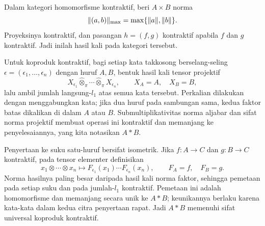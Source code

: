 \begin{o001solution}
\begin{o001proof}
Dalam kategori homomorfisme kontraktif, beri $A\times B$ norma
\[
  \lVert(a,b)\rVert_{\max}=\max\{\lVert a\rVert,\lVert b\rVert\}.
\]
Proyeksinya kontraktif, dan pasangan $h=(f,g)$ kontraktif apabila $f$ dan
$g$ kontraktif. Jadi inilah hasil kali pada kategori tersebut.

Untuk koproduk kontraktif, bagi setiap kata takkosong berselang-seling
$\epsilon=(\epsilon_1,\ldots,\epsilon_n)$ dengan huruf $A,B$, bentuk hasil
kali tensor projektif
\[
 X_{\epsilon_1}\mathbin{\widehat{\otimes}_{\pi}}\cdots
 \mathbin{\widehat{\otimes}_{\pi}}X_{\epsilon_n},
 \qquad X_A=A,\quad X_B=B,
\]
lalu ambil jumlah langsung-$l_1$ atas semua kata tersebut. Perkalian
dilakukan dengan menggabungkan kata; jika dua huruf pada sambungan sama,
kedua faktor batas dikalikan di dalam $A$ atau $B$. Submultiplikativitas
norma aljabar dan sifat norma projektif membuat operasi ini kontraktif dan
memanjang ke penyelesaiannya, yang kita notasikan $A*B$.

Penyertaan ke suku satu-huruf bersifat isometrik. Jika
$f:A\to C$ dan $g:B\to C$ kontraktif, pada tensor elementer definisikan
\[
 x_1\otimes\cdots\otimes x_n\longmapsto
 F_{\epsilon_1}(x_1)\cdots F_{\epsilon_n}(x_n),
 \qquad F_A=f,\quad F_B=g.
\]
Norma hasilnya paling besar daripada hasil kali norma faktor, sehingga
pemetaan pada setiap suku dan pada jumlah-$l_1$ kontraktif. Pemetaan ini
adalah homomorfisme dan memanjang secara unik ke $A*B$; keunikannya berlaku
karena kata-kata dalam kedua citra penyertaan rapat. Jadi $A*B$ memenuhi
sifat universal koproduk kontraktif.
\end{o001proof}
\end{o001solution}

